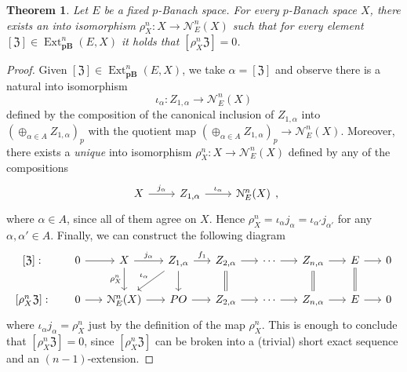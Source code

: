 \documentclass[12pt,a4paper]{amsproc}
\newtheorem{thm}{Theorem}[section]
\theoremstyle{remark}
\theoremstyle{definition}
\newcommand{\Ext}{\operatorname{Ext}}
\newcommand{\pBan}{\operatorname{\textbf{pB}}}
\numberwithin{equation}{section}
\begin{document}
	\begin{thm}\label{0}
		Let $E$ be a fixed $p$-Banach space. For every $p$-Banach space $X$, there exists an into isomorphism $\rho^n_X: X \to \mathcal{N}_E^n(X)$ such that for every element $[\mathfrak{Z}] \in \Ext^n_{\pBan}(E,X)$ it holds that $[\rho_X^n\mathfrak{Z}]=0$.
	\end{thm}
	\begin{proof} Given $[\mathfrak{Z}] \in \Ext^n_{\pBan}(E,X)$, we take $\alpha = [\mathfrak{Z}]$ and observe there is a natural into isomorphism 
		\[ \iota_{\alpha}:Z_{1, \alpha} \longrightarrow \mathcal{N}_E^n(X)\]
		defined by the composition of the canonical inclusion of $Z_{1,\alpha}$ into $\left(\oplus_{\alpha \in A} Z_{1,\alpha}\right)_p$ with the quotient map $\left(\oplus_{\alpha \in A} Z_{1,\alpha}\right)_p \to \mathcal{N}_E^n(X)$.
		Moreover, there exists a \emph{unique} into isomorphism $\rho_X^n:X \to \mathcal N_E^n(X)$ defined by any of the compositions
		\begin{equation}
			\notag 
			\begin{tikzcd}
				X \arrow[r, "j_\alpha"] & Z_{1, \alpha} \arrow[r, "\iota_{\alpha}"] & \mathcal{N}_E^n(X)
			\end{tikzcd},
		\end{equation}
		where $\alpha\in A$, since all of them agree on $X$. Hence $\rho_X^n=\iota_{\alpha} j_{\alpha}=\iota_{\alpha'} j_{\alpha'}$ for any $\alpha, \alpha'\in A$.
		Finally, we can construct the following diagram
		\begin{equation}
	\notag
	\begin{tikzcd}[column sep=0.55cm]
		{[\mathfrak{Z}]}: & 0 \arrow[r] & X \arrow[r, "{j_\alpha}"] \arrow[d, "{\rho_X^n}"'] & {Z_{1,\alpha}} \arrow[r, "f_1"] \arrow[d] \arrow[ld, "{\iota_\alpha}"'] & {Z_{2,\alpha}} \arrow[r] \arrow[d, equal] & \cdots \arrow[r] & {Z_{n,\alpha}} \arrow[r] \arrow[d, equal] & E \arrow[r] \arrow[d, equal] & 0 \\
		{[\rho_X^n\mathfrak{Z}]}: & 0 \arrow[r] & {\mathcal{N}_E^n(X)} \arrow[r] & PO \arrow[r] & {Z_{2,\alpha}} \arrow[r] & \cdots \arrow[r] & {Z_{n,\alpha}} \arrow[r] & E \arrow[r] & 0
	\end{tikzcd}
\end{equation}
		where $\iota_{\alpha} j_{\alpha}=\rho_X^n$ just by the definition of the map $\rho_X^n$.
		This is enough to conclude that $[\rho_X^n\mathfrak{Z}]=0$, since $[\rho_X^n\mathfrak{Z}]$ can be broken into a (trivial) short exact sequence and an $(n-1)$-extension. 
	\end{proof}
	
\end{document}
